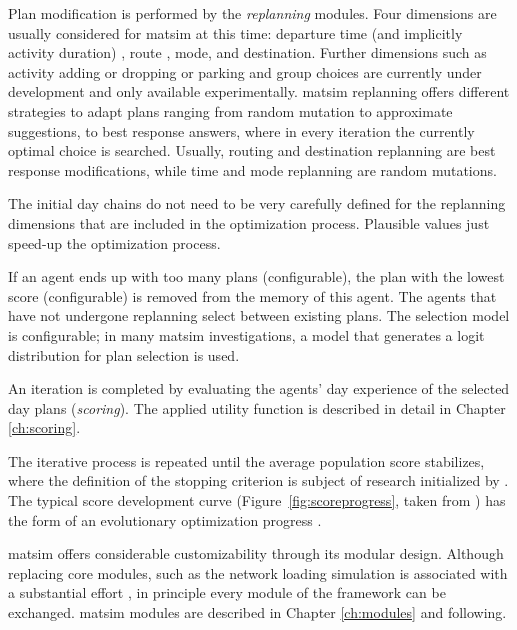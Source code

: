 Plan modification is performed by the \emph{replanning} modules. Four dimensions are usually considered for \gls{matsim} at this time: departure time (and implicitly activity duration) \citep[][]{BalmerEtAl_Timmermans_2005}, route \citep[]{LefebvreBalmer_STRC_2007}, mode, and destination. Further dimensions such as activity adding or dropping or parking and group choices are currently under development and only available experimentally. %
\gls{matsim} replanning offers different strategies to adapt plans ranging from random mutation to approximate suggestions, to best response answers, where in every iteration the currently optimal choice is searched. Usually, routing and destination replanning are best response modifications, while time and mode replanning are random mutations. 

The initial day chains do not need to be very carefully defined for the replanning dimensions that are included in the optimization process. Plausible values just speed-up the optimization process. 

If an agent ends up with too many plans (configurable), the plan with the lowest score (configurable) is removed from the memory of this agent. The agents that have not undergone replanning select between existing plans. The selection model is configurable; in many \gls{matsim} investigations, a model that generates a logit distribution for plan selection is used.

An iteration is completed by evaluating the agents' day experience of the selected day plans (\emph{scoring}). The applied utility function is described in detail in Chapter \ref{ch:scoring}.

The iterative process is repeated until the average population score stabilizes, where the definition of the stopping criterion is subject of research initialized by \citet[][]{Meister_PhDThesis_2011, NagelFloetteroed2009IatbrResourceInBook}. The typical score development curve (Figure~\ref{fig:scoreprogress}, taken from \citet[][]{HorniEtAl_TRR_2009}) has the form of an evolutionary optimization progress \citep[][p.]{EibenSmithJE_2003}.

\gls{matsim} offers considerable customizability through its modular design. Although replacing core modules, such as the network loading simulation is associated with a substantial effort \citep[][Section 2.4]{MATSim_Userguide_2015}, in principle every module of the framework can be exchanged. \gls{matsim} modules are described in Chapter \ref{ch:modules} and following.

